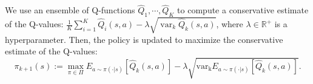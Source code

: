 We use an ensemble of Q-functions $\hat{Q}_1, \cdots, \hat{Q}_K$ to compute a conservative estimate of the Q-values: $\frac{1}{K} \sum_{i=1}^K \hat{Q}_i (s, a) - \lambda \sqrt{\operatorname{var}_k \hat{Q}_k(s, a)}$, where $\lambda \in \mathbb{R}^+$ is a hyperparameter. %
Then, the policy is updated to maximize the conservative estimate of the Q-values: $$ \pi_{k+1}(s) := \max_{\pi \in \Pi} E_{a \sim \pi(\cdot|s)} [\hat{Q}_{k}(s, a)] - \lambda \sqrt{ \operatorname{var_k}E_{a \sim \pi(\cdot |s) }[\hat{Q}_k(s, a)]}.$$







